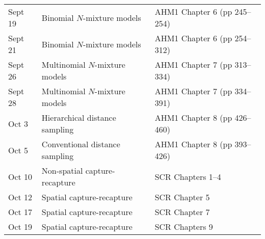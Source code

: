 \documentclass[12pt]{article}
\begin{document}
\begin{center}
\begin{tabular}[c]{lll}
\hline
Sept 19    & Binomial $N$-mixture models                  & AHM1 Chapter 6 (pp 245--254)                         \\
Sept 21    & Binomial $N$-mixture models                  & AHM1 Chapter 6 (pp 254--312)                         \\
\hline
Sept 26    & Multinomial $N$-mixture models               & AHM1 Chapter 7 (pp 313--334)                         \\
Sept 28    & Multinomial $N$-mixture models               & AHM1 Chapter 7 (pp 334--391)                         \\
\hline
Oct 3     & Hierarchical distance sampling               & AHM1 Chapter 8 (pp 426--460)                          \\
Oct 5     & Conventional distance sampling               & AHM1 Chapter 8 (pp 393--426)                         \\
\hline
Oct 10     & Non-spatial capture-recapture                & SCR Chapters 1--4                         \\
Oct 12     & Spatial capture-recapture                    & SCR Chapter 5                                \\
\hline
Oct 17     & Spatial capture-recapture                    & SCR Chapter 7                                        \\
Oct 19     & Spatial capture-recapture                    & SCR Chapters 9                                 \\
\hline

\end{tabular}
\end{center}
\end{document}
